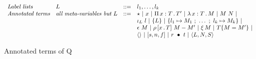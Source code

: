 \documentclass{article}
\begin{document}
\begin{figure}
  \[
  \begin{array}{llll}
    \textit{Label lists} & L & ::= & l_1,\ldots,l_k \\ 
    \textit{Annotated terms} & \textit{all meta-variables but } L & ::= & \star\ |\ x\ |\ \Pia{x}{T}{T'}\ |\  \tlam{x}{T}{M}\ |\ M\ N\ |\\
    \ &\ &\ & \inj{L}{l}\ |\ \{ L \}\ |\ \{ l_1 \mapsto M_1\ ;\ \ldots\ ;\ l_k\mapsto M_k \} \ | \\
    \ &\ &\ & \rfl{M}\ |\ \cng{x}{T}{M}{M'}\ |\ \ext{M}\ |\ \eqtm{M}{T}{M'} \ | \\
    \ &\ &\ & \wunit\ |\ \ctor{s}{n}{f}\ |\ \wrec{r}{t}\ |\ \w{L}{N}{S}
  \end{array}
  \]
\caption{Annotated terms of Q}
\label{fig:syn}
\end{figure}
\end{document}
